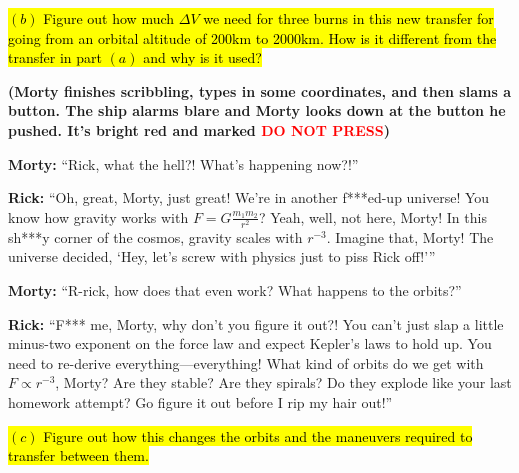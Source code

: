 \documentclass[a4paper, 12pt]{exam}
\begin{document}
\begin{center}
\end{center}

\hl{$(b)$ Figure out how much $\Delta V$ we need for three burns in this new transfer for going from an orbital altitude of 200km to 2000km. How is it different from the transfer in part $(a)$ and why is it used?}

\pagebreak

\noindent \textbf{(Morty finishes scribbling, types in some coordinates, and then slams a button. The ship alarms blare and Morty looks down at the button he pushed. It's bright red and marked \textcolor{red}{DO NOT PRESS})}
\bigskip

\noindent \textbf{Morty:} “Rick, what the hell?! What’s happening now?!”
\bigskip

\noindent \textbf{Rick:} “Oh, great, Morty, just great! We’re in another f***ed-up universe! You know how gravity works with $F = G \frac{m_1 m_2}{r^2}$? Yeah, well, not here, Morty! In this sh***y corner of the cosmos, gravity scales with $r^{-3}$. Imagine that, Morty! The universe decided, ‘Hey, let’s screw with physics just to piss Rick off!’”
\bigskip

\noindent \textbf{Morty:} “R-rick, how does that even work? What happens to the orbits?”
\bigskip

\noindent \textbf{Rick:} “F*** me, Morty, why don’t you figure it out?! You can’t just slap a little minus-two exponent on the force law and expect Kepler’s laws to hold up. You need to re-derive everything—everything! What kind of orbits do we get with $F \propto r^{-3}$, Morty? Are they stable? Are they spirals? Do they explode like your last homework attempt? Go figure it out before I rip my hair out!”

\bigskip

\hl{$(c)$ Figure out how this changes the orbits and the maneuvers required to transfer between them.}
 
\bigskip
\end{document}
